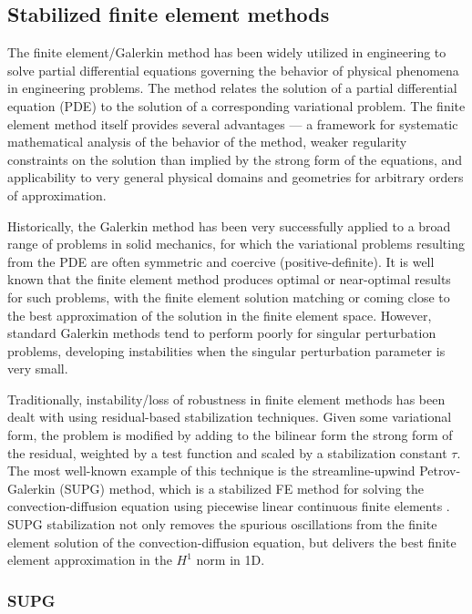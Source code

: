 \subsection{Stabilized finite element methods}

The finite element/Galerkin method has been widely utilized in engineering to solve partial differential equations governing the behavior of physical phenomena in engineering problems.  The method relates the solution of a partial differential equation (PDE) to the solution of a corresponding variational problem. The finite element method itself provides several advantages --- a framework for systematic mathematical analysis of the behavior of the method, weaker regularity constraints on the solution than implied by the strong form of the equations, and applicability to very general physical domains and geometries for arbitrary orders of approximation. 

Historically, the Galerkin method has been very successfully applied to a broad range of problems in solid mechanics, for which the variational problems resulting from the PDE are often symmetric and coercive (positive-definite). It is well known that the finite element method produces optimal or near-optimal results for such problems, with the finite element solution matching or coming close to the best approximation of the solution in the finite element space. However, standard Galerkin methods tend to perform poorly for singular perturbation problems, developing instabilities when the singular perturbation parameter is very small. 

Traditionally, instability/loss of robustness in finite element methods has been dealt with using residual-based stabilization techniques.  Given some variational form, the problem is modified by adding to the bilinear form the strong form of the residual, weighted by a test function and scaled by a stabilization constant $\tau$.  The most well-known example of this technique is the streamline-upwind Petrov-Galerkin (SUPG) method, which is a stabilized FE method for solving the convection-diffusion equation using piecewise linear continuous finite elements \cite{SUPG}.  SUPG stabilization not only removes the spurious oscillations from the finite element solution of the convection-diffusion equation, but delivers the best finite element approximation in the $H^1$ norm in 1D.  

\subsubsection{SUPG}

